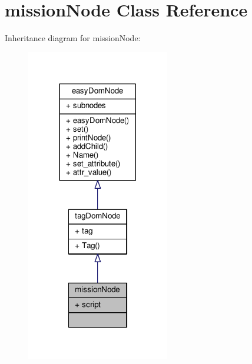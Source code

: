 \hypertarget{classmissionNode}{}\section{mission\+Node Class Reference}
\label{classmissionNode}


Inheritance diagram for mission\+Node\+:
\nopagebreak
\begin{figure}[H]
\begin{center}
\leavevmode
\includegraphics[width=177pt]{dd/db8/classmissionNode__inherit__graph}
\end{center}
\end{figure}


